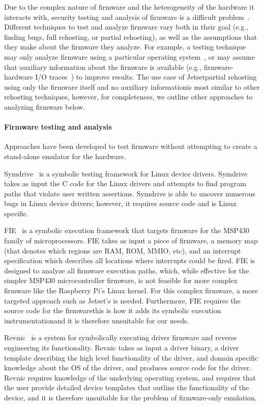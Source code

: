 Due to the complex nature of firmware and the heterogeneity of the hardware it interacts with, security testing and analysis of firmware is a difficult problem~\cite{muench2018you, wright2021challenges}.
Different techniques to test and analyze firmware vary both in their goal (e.g., finding bugs, full rehosting, or partial rehosting), as well as the assumptions that they make about the firmware they analyze.
For example, a testing technique may only analyze firmware using a particular operating system~\cite{firmadyne}, or may assume that auxiliary information about the firmware is available (e.g., firmware-hardware I/O traces~\cite{pretender2019}) to improve results.
The use case of Jetset\textemdash partial rehosting using only the firmware itself and no auxiliary information\textemdash is most similar to other rehosting techniques, however, for completeness, we outline other approaches to analyzing firmware below.

\paragraph{Firmware testing and analysis}
Approaches have been developed to test firmware without attempting to create a stand-alone emulator for the hardware.

Symdrive~\cite{symdrive} is a symbolic testing framework for Linux device drivers.
Symdrive takes as input the C code for the Linux drivers and attempts to find program paths that violate user written assertions. 
Symdrive is able to uncover numerous bugs in Linux device drivers; however, it requires source code and is Linux specific.

FIE~\cite{fie} is a symbolic execution framework that targets firmware for the
MSP430 family of microprocessors.
FIE takes as input a piece of firmware, a memory map (that denotes which regions are RAM, ROM, MMIO, etc), and an interrupt specification which describes all locations where interrupts could be fired. 
FIE is designed to analyze all firmware execution paths, which, while effective for the simpler MSP430 microcontroller firmware, is not feasible for more complex firmware like the Raspberry Pi's Linux kernel. 
For this complex firmware, a more targeted approach such as Jetset's is needed.
Furthermore, FIE requires the source code for the firmware\textemdash this is how it adds its symbolic execution instrumentation\textemdash and it is therefore unsuitable for our needs.

Revnic~\cite{revnic} is a system for symbolically executing driver firmware and reverse engineering its functionality.
Revnic takes as input a driver binary, a driver template describing the high level functionality of the driver, and domain specific knowledge about the OS of the driver, and produces source code for the driver.
Revnic requires knowledge of the underlying operating system, and requires that the user provide detailed device templates that outline the functionality of the device, and it is therefore unsuitable for the problem of firmware-only emulation.

